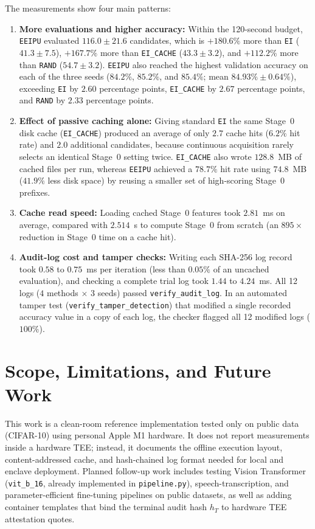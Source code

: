 \documentclass[11pt,letterpaper]{article}
\begin{document}
The measurements show four main patterns:
\begin{enumerate}
  \item \textbf{More evaluations and higher accuracy:} Within the 120-second budget, \texttt{EEIPU} evaluated $116.0 \pm 21.6$ candidates, which is $+180.6\%$ more than \texttt{EI} ($41.3 \pm 7.5$), $+167.7\%$ more than \texttt{EI\_CACHE} ($43.3 \pm 3.2$), and $+112.2\%$ more than \texttt{RAND} ($54.7 \pm 3.2$). \texttt{EEIPU} also reached the highest validation accuracy on each of the three seeds ($84.2\%$, $85.2\%$, and $85.4\%$; mean $84.93\% \pm 0.64\%$), exceeding \texttt{EI} by $2.60$ percentage points, \texttt{EI\_CACHE} by $2.67$ percentage points, and \texttt{RAND} by $2.33$ percentage points.
  \item \textbf{Effect of passive caching alone:} Giving standard \texttt{EI} the same Stage~0 disk cache (\texttt{EI\_CACHE}) produced an average of only $2.7$ cache hits ($6.2\%$ hit rate) and $2.0$ additional candidates, because continuous acquisition rarely selects an identical Stage~0 setting twice. \texttt{EI\_CACHE} also wrote $128.8$~MB of cached files per run, whereas \texttt{EEIPU} achieved a $78.7\%$ hit rate using $74.8$~MB ($41.9\%$ less disk space) by reusing a smaller set of high-scoring Stage~0 prefixes.
  \item \textbf{Cache read speed:} Loading cached Stage~0 features took $2.81$~ms on average, compared with $2.514$~s to compute Stage~0 from scratch (an $895\times$ reduction in Stage~0 time on a cache hit).
  \item \textbf{Audit-log cost and tamper checks:} Writing each SHA-256 log record took $0.58$ to $0.75$~ms per iteration (less than $0.05\%$ of an uncached evaluation), and checking a complete trial log took $1.44$ to $4.24$~ms. All 12 logs ($4$ methods $\times$ $3$ seeds) passed \texttt{verify\_audit\_log}. In an automated tamper test (\texttt{verify\_tamper\_detection}) that modified a single recorded accuracy value in a copy of each log, the checker flagged all 12 modified logs ($100\%$).
\end{enumerate}

\section{Scope, Limitations, and Future Work}
This work is a clean-room reference implementation tested only on public data (CIFAR-10) using personal Apple M1 hardware. It does not report measurements inside a hardware TEE; instead, it documents the offline execution layout, content-addressed cache, and hash-chained log format needed for local and enclave deployment. Planned follow-up work includes testing Vision Transformer (\texttt{vit\_b\_16}, already implemented in \texttt{pipeline.py}), speech-transcription, and parameter-efficient fine-tuning pipelines on public datasets, as well as adding container templates that bind the terminal audit hash $h_T$ to hardware TEE attestation quotes.
\end{document}
